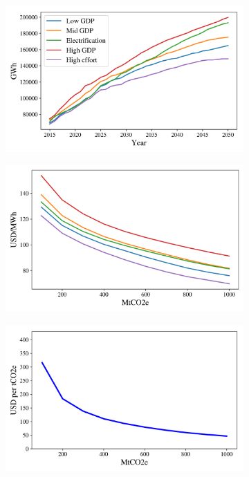 \documentclass[11pt, letterpaper]{article}
\begin{document}
\begin{figure}[ht]
    \begin{subfigure}[t]{0.5\linewidth}
    \includegraphics[width=\textwidth]{Figures/demand_scenarios.png}
    \caption{}
  \label{fig:demand_scn}
  \end{subfigure}
  \begin{subfigure}[t]{0.5\linewidth}
    \includegraphics[width=\textwidth]{Figures/mean_prices_scenarios.png}
    \caption{ }
  \label{fig:mean_price}
  \end{subfigure}
  \begin{subfigure}[t]{0.5\linewidth}
    \includegraphics[width=\textwidth]{Figures/price_allowances.png}

\end{subfigure}
\end{figure}
\end{document}
